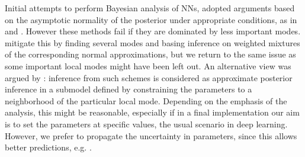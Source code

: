 Initial attempts to perform Bayesian analysis
of NNs, adopted
arguments based on the asymptotic normality of the posterior
under appropriate conditions, as in  
\cite{mckay} and \cite{buntineweigend}. However these methods
fail if they are dominated by  
less important modes. %
 \cite{buntineweigend} mitigate this by finding several modes and
basing inference on weighted mixtures of the corresponding normal approximations, but we return to the same issue as some
important local modes might have been left out. An alternative view was argued
by \cite{mckay}: inference from such schemes is 
 considered as approximate
posterior inference in a submodel defined by constraining the
parameters to a neighborhood of the particular local mode. Depending on
the emphasis of the analysis, this might be reasonable, especially if in a final
implementation our aim is to set the parameters at specific values,
the usual scenario in deep learning. However,
we prefer to propagate the uncertainty in parameters, since this allows
better predictions, e.g. \citep{raftery}. 

